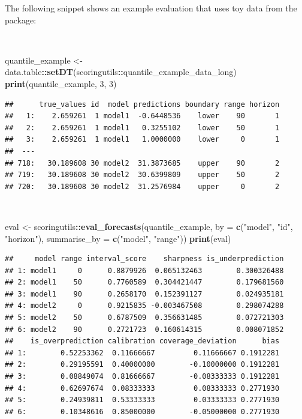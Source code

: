 \documentclass[
]{book}
\newenvironment{Shaded}{\begin{snugshade}}{\end{snugshade}}
\newcommand{\DataTypeTok}[1]{\textcolor[rgb]{0.13,0.29,0.53}{#1}}
\newcommand{\DecValTok}[1]{\textcolor[rgb]{0.00,0.00,0.81}{#1}}
\newcommand{\KeywordTok}[1]{\textcolor[rgb]{0.13,0.29,0.53}{\textbf{#1}}}
\newcommand{\NormalTok}[1]{#1}
\newcommand{\OperatorTok}[1]{\textcolor[rgb]{0.81,0.36,0.00}{\textbf{#1}}}
\newcommand{\StringTok}[1]{\textcolor[rgb]{0.31,0.60,0.02}{#1}}
\begin{document}
The following snippet shows an example evaluation that uses toy data from the package:

\(~\)

\begin{Shaded}
\begin{Highlighting}[]
\NormalTok{quantile\_example \textless{}{-}}\StringTok{ }\NormalTok{data.table}\OperatorTok{::}\KeywordTok{setDT}\NormalTok{(scoringutils}\OperatorTok{::}\NormalTok{quantile\_example\_data\_long)}
\KeywordTok{print}\NormalTok{(quantile\_example, }\DecValTok{3}\NormalTok{, }\DecValTok{3}\NormalTok{)}
\end{Highlighting}
\end{Shaded}

\begin{verbatim}
##      true_values id  model predictions boundary range horizon
##   1:    2.659261  1 model1  -0.6448536    lower    90       1
##   2:    2.659261  1 model1   0.3255102    lower    50       1
##   3:    2.659261  1 model1   1.0000000    lower     0       1
##  ---                                                         
## 718:   30.189608 30 model2  31.3873685    upper    90       2
## 719:   30.189608 30 model2  30.6399809    upper    50       2
## 720:   30.189608 30 model2  31.2576984    upper     0       2
\end{verbatim}

\(~\)

\begin{Shaded}
\begin{Highlighting}[]
\NormalTok{eval \textless{}{-}}\StringTok{ }\NormalTok{scoringutils}\OperatorTok{::}\KeywordTok{eval\_forecasts}\NormalTok{(quantile\_example, }
                                     \DataTypeTok{by =} \KeywordTok{c}\NormalTok{(}\StringTok{"model"}\NormalTok{, }\StringTok{"id"}\NormalTok{, }\StringTok{"horizon"}\NormalTok{),}
                                     \DataTypeTok{summarise\_by =} \KeywordTok{c}\NormalTok{(}\StringTok{"model"}\NormalTok{, }\StringTok{"range"}\NormalTok{))}
\KeywordTok{print}\NormalTok{(eval)}
\end{Highlighting}
\end{Shaded}

\begin{verbatim}
##     model range interval_score    sharpness is_underprediction
## 1: model1     0      0.8879926  0.065132463        0.300326488
## 2: model1    50      0.7760589  0.304421447        0.179681560
## 3: model1    90      0.2658170  0.152391127        0.024935181
## 4: model2     0      0.9215835 -0.003467508        0.298074288
## 5: model2    50      0.6787509  0.356631485        0.072721303
## 6: model2    90      0.2721723  0.160614315        0.008071852
##    is_overprediction calibration coverage_deviation      bias
## 1:        0.52253362  0.11666667         0.11666667 0.1912281
## 2:        0.29195591  0.40000000        -0.10000000 0.1912281
## 3:        0.08849074  0.81666667        -0.08333333 0.1912281
## 4:        0.62697674  0.08333333         0.08333333 0.2771930
## 5:        0.24939811  0.53333333         0.03333333 0.2771930
## 6:        0.10348616  0.85000000        -0.05000000 0.2771930
\end{verbatim}
\end{document}
